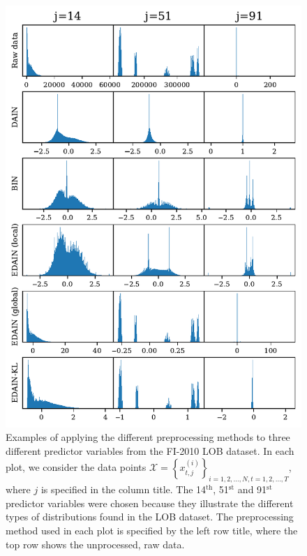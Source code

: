 \documentclass{statsmsc}
\begin{document}
{%

\begin{figure}
\begin{center}
    \includegraphics[scale=1]{figures/lob_example_transformations.pdf}
\end{center}
\caption{
    Examples of applying the different preprocessing methods to three different predictor
    variables from the FI-2010 \ac{LOB} dataset. In each plot, we consider the
    data points
    $\mathcal{X}=\left\{x^{(i)}_{t,j}\right\}_{i=1,2,\dots,N,t=1,2,\dots,T}$,
    where $j$ is specified in the column title.
    The 14$^{\textrm{th}}$, 51$^{\textrm{st}}$ and 91$^{\textrm{st}}$ predictor variables
    were chosen because they illustrate the different types of distributions found in
    the \ac{LOB} dataset.
    The preprocessing method used in each plot is specified by the left row title, where the top
    row shows the unprocessed, raw data.
}
\label{fig:lob_examples}
\end{figure}

}
\end{document}

